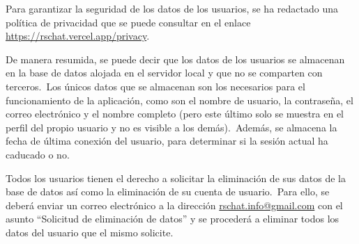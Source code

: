 \label{anx:gantt}



\label{anx:politica-privacidad-proteccion-datos}

Para garantizar la seguridad de los datos de los usuarios, se ha redactado una política de privacidad
que se puede consultar en el enlace \href{https://rschat.vercel.app/privacy}{https://rschat.vercel.app/privacy}.

De manera resumida, se puede decir que los datos de los usuarios se almacenan en la base de datos alojada en el
servidor local y que no se comparten con terceros.\ Los únicos datos que se almacenan son los necesarios para el
funcionamiento de la aplicación, como son el nombre de usuario, la contraseña, el correo electrónico y el nombre
completo (pero este último solo se muestra en el perfil del propio usuario y no es visible a los demás).\ Además, se
almacena la fecha de última conexión del usuario, para determinar si la sesión actual ha caducado o no.

Todos los usuarios tienen el derecho a solicitar la eliminación de sus datos de la base de datos así como
la eliminación de su cuenta de usuario.\ Para ello, se deberá enviar un correo electrónico a la dirección
\href{mailto:rschat.info@gmail.com}{rschat.info@gmail.com} con el asunto ``Solicitud de eliminación de datos'' y se
procederá a eliminar todos los datos del usuario que el mismo solicite.

